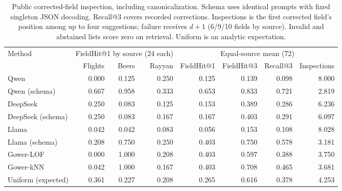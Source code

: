 \begin{table}[t]
\centering\scriptsize
\caption{Public corrected-field inspection, including canonicalization. Schema uses identical prompts with fixed singleton JSON decoding. Recall@3 covers recorded corrections. Inspections is the first corrected field's position among up to four suggestions; failure receives $d+1$ (6/9/10 fields by source). Invalid and abstained lists score zero on retrieval. Uniform is an analytic expectation.}
\setlength{\tabcolsep}{3pt}
\renewcommand{\arraystretch}{1.16}
\begin{tabular*}{\textwidth}{@{\extracolsep{\fill}}|l|rrr|rrrr|}
\hline
Method & \multicolumn{3}{c|}{FieldHit@1 by source (24 each)} & \multicolumn{4}{c|}{Equal-source mean (72)} \\
\cline{2-8}
 & Flights & Beers & Rayyan & FieldHit@1 & FieldHit@3 & Recall@3 & Inspections \\
\hline
Qwen & 0.000 & 0.125 & 0.250 & 0.125 & 0.139 & 0.098 & 8.000 \\
Qwen (schema) & 0.667 & 0.958 & 0.333 & 0.653 & 0.833 & 0.721 & 2.819 \\
DeepSeek & 0.250 & 0.083 & 0.125 & 0.153 & 0.389 & 0.286 & 6.236 \\
DeepSeek (schema) & 0.250 & 0.083 & 0.167 & 0.167 & 0.403 & 0.291 & 6.097 \\
Llama & 0.042 & 0.042 & 0.083 & 0.056 & 0.153 & 0.108 & 8.028 \\
Llama (schema) & 0.208 & 0.750 & 0.250 & 0.403 & 0.750 & 0.578 & 3.181 \\
Gower-LOF & 0.000 & 1.000 & 0.208 & 0.403 & 0.597 & 0.388 & 3.750 \\
Gower-kNN & 0.042 & 1.000 & 0.167 & 0.403 & 0.708 & 0.465 & 3.681 \\
Uniform (expected) & 0.361 & 0.227 & 0.208 & 0.265 & 0.616 & 0.378 & 4.253 \\
\hline
\end{tabular*}
\renewcommand{\arraystretch}{1.0}
\label{tab:real-cells}
\end{table}
